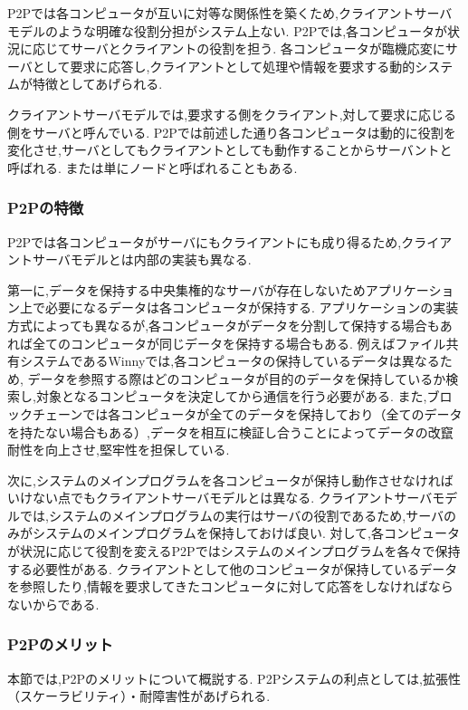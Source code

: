 P2Pでは各コンピュータが互いに対等な関係性を築くため,クライアントサーバモデルのような明確な役割分担がシステム上ない.
P2Pでは,各コンピュータが状況に応じてサーバとクライアントの役割を担う.
各コンピュータが臨機応変にサーバとして要求に応答し,クライアントとして処理や情報を要求する動的システムが特徴としてあげられる.

クライアントサーバモデルでは,要求する側をクライアント,対して要求に応じる側をサーバと呼んでいる.
P2Pでは前述した通り各コンピュータは動的に役割を変化させ,サーバとしてもクライアントとしても動作することからサーバントと呼ばれる.
または単にノードと呼ばれることもある.

\subsubsection{P2Pの特徴}

P2Pでは各コンピュータがサーバにもクライアントにも成り得るため,クライアントサーバモデルとは内部の実装も異なる.

第一に,データを保持する中央集権的なサーバが存在しないためアプリケーション上で必要になるデータは各コンピュータが保持する.
アプリケーションの実装方式によっても異なるが,各コンピュータがデータを分割して保持する場合もあれば全てのコンピュータが同じデータを保持する場合もある.
例えばファイル共有システムであるWinnyでは,各コンピュータの保持しているデータは異なるため,
データを参照する際はどのコンピュータが目的のデータを保持しているか検索し,対象となるコンピュータを決定してから通信を行う必要がある.
また,ブロックチェーンでは各コンピュータが全てのデータを保持しており（全てのデータを持たない場合もある）,データを相互に検証し合うことによってデータの改竄耐性を向上させ,堅牢性を担保している.

次に,システムのメインプログラムを各コンピュータが保持し動作させなければいけない点でもクライアントサーバモデルとは異なる.
クライアントサーバモデルでは,システムのメインプログラムの実行はサーバの役割であるため,サーバのみがシステムのメインプログラムを保持しておけば良い.
対して,各コンピュータが状況に応じて役割を変えるP2Pではシステムのメインプログラムを各々で保持する必要性がある.
クライアントとして他のコンピュータが保持しているデータを参照したり,情報を要求してきたコンピュータに対して応答をしなければならないからである.

\subsubsection{P2Pのメリット}

本節では,P2Pのメリットについて概説する.
P2Pシステムの利点としては,拡張性（スケーラビリティ）・耐障害性があげられる.

